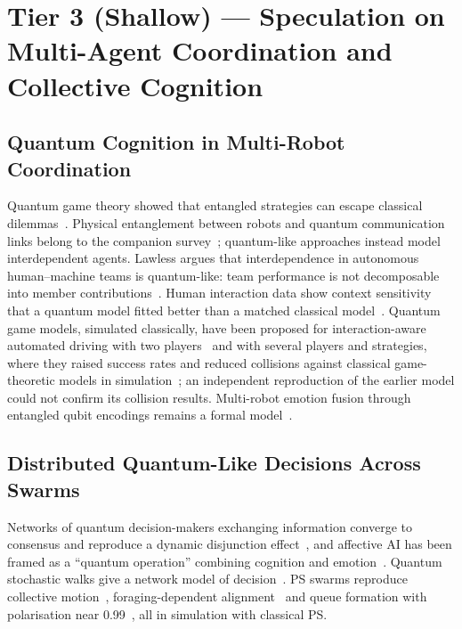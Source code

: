 \documentclass[pdflatex,sn-basic]{sn-jnl}
\begin{document}
\section{Tier 3 (Shallow) --- Speculation on Multi-Agent Coordination and Collective Cognition}\label{sec:multi}

\subsection{Quantum Cognition in Multi-Robot Coordination}\label{sec:teams}
Quantum game theory showed that entangled strategies can escape classical dilemmas~\citep{Eisert1999}. Physical entanglement between robots and quantum communication links belong to the companion survey~\citep{Guru2026}; quantum-like approaches instead model interdependent agents. Lawless argues that interdependence in autonomous human--machine teams is quantum-like: team performance is not decomposable into member contributions~\citep{Lawless2020,Lawless2023,Lawless2025}. Human interaction data show context sensitivity that a quantum model fitted better than a matched classical model~\citep{Waddup2021}. Quantum game models, simulated classically, have been proposed for interaction-aware automated driving with two players~\citep{Essalmi2025} and with several players and strategies, where they raised success rates and reduced collisions against classical game-theoretic models in simulation~\citep{Essalmi2026}; an independent reproduction of the earlier model could not confirm its collision results. Multi-robot emotion fusion through entangled qubit encodings remains a formal model~\citep{Yan2021a}.

\subsection{Distributed Quantum-Like Decisions Across Swarms}\label{sec:swarms}
Networks of quantum decision-makers exchanging information converge to consensus and reproduce a dynamic disjunction effect~\citep{Yukalov2018,Yukalov2022}, and affective AI has been framed as a ``quantum operation'' combining cognition and emotion~\citep{Yukalov2023}. Quantum stochastic walks give a network model of decision~\citep{MartinezMartinez2016}. PS swarms reproduce collective motion~\citep{Ried2019}, foraging-dependent alignment~\citep{LopezIncera2020} and queue formation with polarisation near 0.99~\citep{Kong2026}, all in simulation with classical PS.
\end{document}
